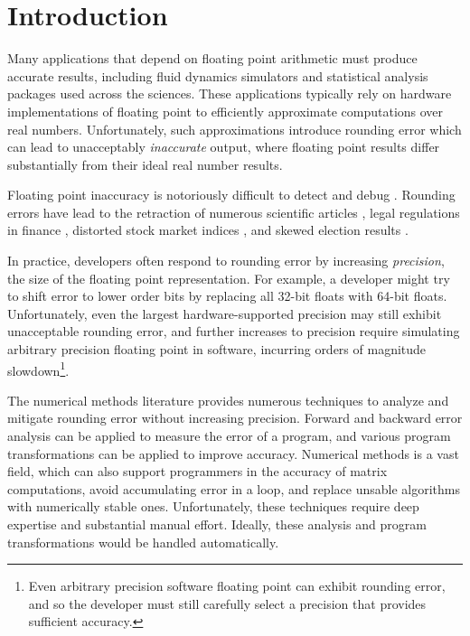 \documentclass[paper.tex]{subfiles}
\begin{document}
\section{Introduction}
\label{sec:introduction}

Many applications that depend on floating point arithmetic must
produce accurate results, including fluid dynamics simulators and
statistical analysis packages used across the sciences.  These
applications typically rely on hardware implementations of floating
point to efficiently approximate computations over real numbers.
Unfortunately, such approximations introduce rounding error which can
lead to unacceptably \textit{inaccurate} output, where floating point
results differ substantially from their ideal real number results.


Floating point inaccuracy is notoriously difficult to detect and debug
.  Rounding errors have lead to the retraction of
numerous scientific articles , legal regulations in finance
, distorted stock market indices , and skewed
election results .

In practice, developers often respond to rounding error by increasing
\textit{precision}, the size of the floating point representation.
For example, a developer might try to shift error to lower order bits
by replacing all 32-bit floats with 64-bit floats.  Unfortunately,
even the largest hardware-supported precision may still exhibit
unacceptable rounding error, and further increases to precision
require simulating arbitrary precision floating point in software,
incurring orders of magnitude slowdown\footnote{Even arbitrary
  precision software floating point can exhibit rounding error, and so
  the developer must still carefully select a precision that provides
  sufficient accuracy.}.

The numerical methods literature provides numerous techniques
  to analyze and mitigate rounding error without increasing precision.
Forward and backward error analysis 
  can be applied to measure the error of a program,
  and various program transformations 
  can be applied to improve accuracy.
Numerical methods is a vast field, which can also
  support programmers in the accuracy of matrix computations,
  avoid accumulating error in a loop,
  and replace unsable algorithms with numerically stable ones.
Unfortunately, these techniques require deep expertise
  and substantial manual effort.
Ideally, these analysis and program transformations
  would be handled automatically.
\end{document}

